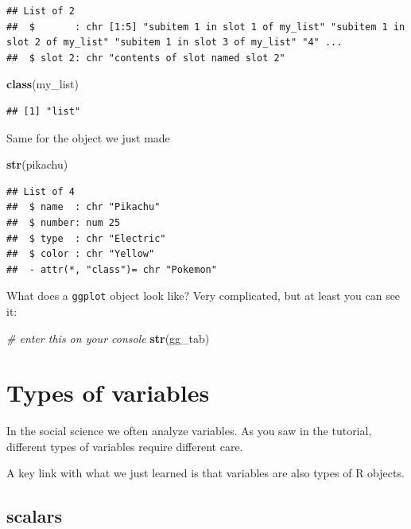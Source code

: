 \documentclass[]{book}
\newenvironment{Shaded}{\begin{snugshade}}{\end{snugshade}}
\newcommand{\KeywordTok}[1]{\textcolor[rgb]{0.13,0.29,0.53}{\textbf{#1}}}
\newcommand{\CommentTok}[1]{\textcolor[rgb]{0.56,0.35,0.01}{\textit{#1}}}
\newcommand{\NormalTok}[1]{#1}
\theoremstyle{definition}
\theoremstyle{definition}
\theoremstyle{definition}
\theoremstyle{remark}
\begin{document}
\begin{verbatim}
## List of 2
##  $       : chr [1:5] "subitem 1 in slot 1 of my_list" "subitem 1 in slot 2 of my_list" "subitem 1 in slot 3 of my_list" "4" ...
##  $ slot 2: chr "contents of slot named slot 2"
\end{verbatim}

\begin{Shaded}
\begin{Highlighting}[]
\KeywordTok{class}\NormalTok{(my_list)}
\end{Highlighting}
\end{Shaded}

\begin{verbatim}
## [1] "list"
\end{verbatim}

Same for the object we just made

\begin{Shaded}
\begin{Highlighting}[]
\KeywordTok{str}\NormalTok{(pikachu)}
\end{Highlighting}
\end{Shaded}

\begin{verbatim}
## List of 4
##  $ name  : chr "Pikachu"
##  $ number: num 25
##  $ type  : chr "Electric"
##  $ color : chr "Yellow"
##  - attr(*, "class")= chr "Pokemon"
\end{verbatim}

What does a \texttt{ggplot} object look like? Very complicated, but at
least you can see it:

\begin{Shaded}
\begin{Highlighting}[]
\CommentTok{# enter this on your console}
\KeywordTok{str}\NormalTok{(gg_tab)}
\end{Highlighting}
\end{Shaded}

\section{Types of variables}\label{types-of-variables}

In the social science we often analyze variables. As you saw in the
tutorial, different types of variables require different care.

A key link with what we just learned is that variables are also types of
R objects.

\subsection{scalars}\label{scalars}
\end{document}
